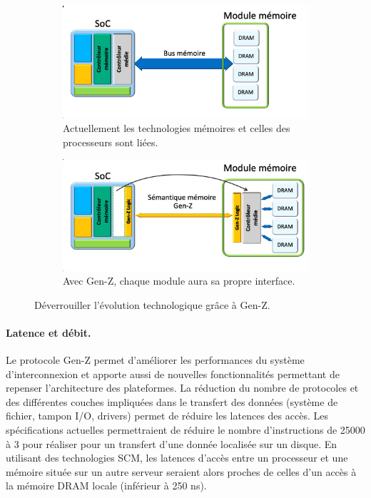             \begin{figure}[t!]
                \centering
                \begin{subfigure}[t]{0.49\textwidth}
                    \centering
                    \includegraphics[width=\linewidth]{images/edl_genz_current_bus.png}
                    \caption{\label{fig:edl_genz_current_bus} Actuellement les technologies mémoires et celles des processeurs sont liées.}
                \end{subfigure}\hfill
                \begin{subfigure}[t]{0.49\textwidth}
                    \centering
                    \includegraphics[width=\linewidth]{images/edl_genz_new_bus.png}
                    \caption{\label{fig:edl_genz_new_bus} Avec Gen-Z, chaque module aura sa propre interface.}
                \end{subfigure}
                \caption{\label{fig:edl_genz_bus_evo} Déverrouiller l'évolution technologique grâce à Gen-Z.}
            \end{figure}


    \paragraph{Latence et débit.}

        Le protocole Gen-Z permet d'améliorer les performances du système d'interconnexion et apporte aussi de nouvelles fonctionnalités permettant de repenser l'architecture des plateformes. La réduction du nombre de protocoles et des différentes couches impliquées dans le transfert des données (système de fichier, tampon I/O, drivers) permet de réduire les latences des accès. Les spécifications actuelles permettraient de réduire le nombre d'instructions de 25000 à 3 pour réaliser pour un transfert d'une donnée localisée sur un disque. En utilisant des technologies SCM, les latences d'accès entre un processeur et une mémoire située sur un autre serveur seraient alors proches de celles d'un accès à la mémoire DRAM locale (inférieur à 250 ns).
     
